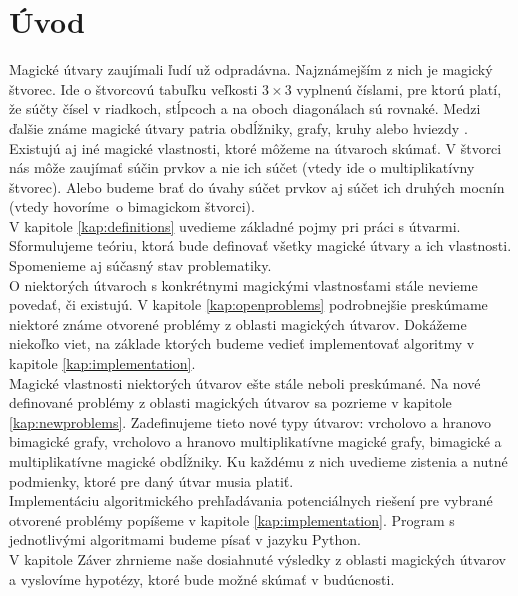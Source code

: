 \chapter*{Úvod} %

Magické útvary zaujímali ľudí už odpradávna. Najznámejším z nich je magický štvorec. Ide o štvorcovú tabuľku veľkosti $3 \times 3$ vyplnenú číslami, pre ktorú platí, že súčty čísel v riadkoch, stĺpcoch a na oboch diagonálach sú rovnaké. Medzi ďalšie známe magické útvary patria obdĺžniky, grafy, kruhy alebo hviezdy \cite{antimagic}. \\

Existujú aj iné magické vlastnosti, ktoré môžeme na útvaroch skúmať. V štvorci nás môže zaujímať súčin prvkov a nie ich súčet (vtedy ide o multiplikatívny štvorec). Alebo budeme brať do úvahy súčet prvkov aj súčet ich druhých mocnín (vtedy hovoríme~o bimagickom štvorci). \\

V kapitole \ref{kap:definitions} uvedieme základné pojmy pri práci s útvarmi. Sformulujeme teóriu, ktorá bude definovať všetky magické útvary a ich vlastnosti. Spomenieme aj súčasný stav problematiky. \\

O niektorých útvaroch s konkrétnymi magickými vlastnosťami stále nevieme povedať, či existujú. V kapitole \ref{kap:openproblems} podrobnejšie preskúmame niektoré známe otvorené problémy z oblasti magických útvarov. Dokážeme niekoľko viet, na základe ktorých budeme vedieť implementovať algoritmy v kapitole \ref{kap:implementation}. \\

Magické vlastnosti niektorých útvarov ešte stále neboli preskúmané. Na nové definované problémy z oblasti magických útvarov sa pozrieme v kapitole \ref{kap:newproblems}. Zadefinujeme tieto nové typy útvarov: vrcholovo a hranovo bimagické grafy, vrcholovo a hranovo multiplikatívne magické grafy, bimagické a multiplikatívne magické obdĺžniky. Ku každému z nich uvedieme zistenia a nutné podmienky, ktoré pre daný útvar musia platiť. \\

Implementáciu algoritmického prehľadávania potenciálnych riešení pre vybrané otvorené problémy popíšeme v kapitole \ref{kap:implementation}. Program s jednotlivými algoritmami budeme písať v jazyku Python. \\

V kapitole Záver zhrnieme naše dosiahnuté výsledky z oblasti magických útvarov a vyslovíme hypotézy, ktoré bude možné skúmať v budúcnosti.
